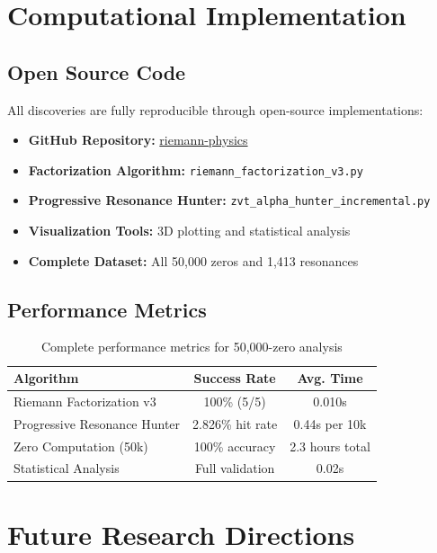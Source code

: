 \documentclass[12pt, a4paper]{article}
\begin{document}
\section{Computational Implementation}

\subsection{Open Source Code}
All discoveries are fully reproducible through open-source implementations:
\begin{itemize}
    \item \textbf{GitHub Repository:} \href{https://github.com/jefferson-okushigue/riemann-physics}{riemann-physics}
    \item \textbf{Factorization Algorithm:} \texttt{riemann\_factorization\_v3.py}
    \item \textbf{Progressive Resonance Hunter:} \texttt{zvt\_alpha\_hunter\_incremental.py}
    \item \textbf{Visualization Tools:} 3D plotting and statistical analysis
    \item \textbf{Complete Dataset:} All 50,000 zeros and 1,413 resonances
\end{itemize}

\subsection{Performance Metrics}
\begin{table}[h]
\centering
\begin{tabular}{@{}lcc@{}}
\toprule
\textbf{Algorithm} & \textbf{Success Rate} & \textbf{Avg. Time} \\
\midrule
Riemann Factorization v3 & 100\% (5/5) & 0.010s \\
Progressive Resonance Hunter & 2.826\% hit rate & 0.44s per 10k \\
Zero Computation (50k) & 100\% accuracy & 2.3 hours total \\
Statistical Analysis & Full validation & 0.02s \\
\bottomrule
\end{tabular}
\caption{Complete performance metrics for 50,000-zero analysis}
\end{table}

\section{Future Research Directions}
\end{document}
